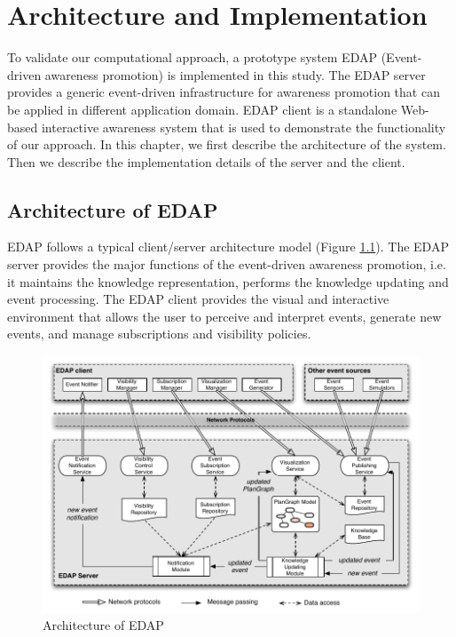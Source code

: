 \graphicspath{{Figures/}}

\chapter{Architecture and Implementation} %
\label{cha:system_implementation}
To validate our computational approach, a prototype system EDAP (Event-driven awareness promotion) is implemented in this study. The EDAP server provides a generic event-driven infrastructure for awareness promotion that can be applied in different application domain. EDAP client is a standalone Web-based interactive awareness system that is used to demonstrate the functionality of our approach. In this chapter, we first describe the architecture of the system. Then we describe the implementation details of the server and the client.

\section{Architecture of EDAP} %
\label{sec:architecture_of_edap}
EDAP follows a typical client/server architecture model (Figure \ref{fig:edap_architecture}). The EDAP server provides the major functions of the event-driven awareness promotion, i.e. it maintains the knowledge representation, performs the knowledge updating and event processing. The EDAP client provides the visual and interactive environment that allows the user to perceive and interpret events,  generate new events, and manage subscriptions and visibility policies.

\begin{figure}[htbp] %
	\centering
	\includegraphics{edap_architecture.pdf} 
	\caption{Architecture of EDAP}
	\label{fig:edap_architecture}
\end{figure}

